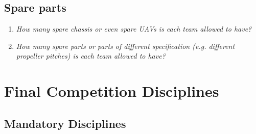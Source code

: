     \subsection{Spare parts}
    \begin{enumerate}
      \item \emph{How many spare chassis or even spare UAVs is each team allowed to have?}
      \item \emph{How many spare parts or parts of different specification (e.g. different propeller pitches) is each team allowed to have?}
    \end{enumerate}

    \section{Final Competition Disciplines}
    \subsection{Mandatory Disciplines}

